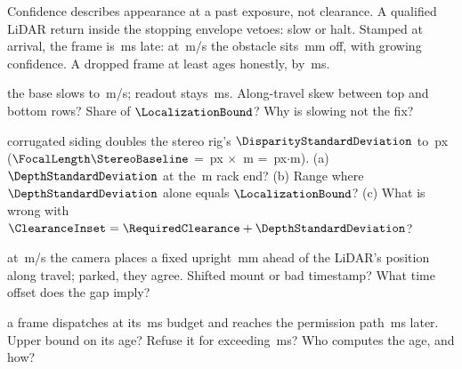 \documentclass{studysheet}
\begin{document}
\begin{rightcol}
%
  {Confidence describes appearance at a past exposure, not clearance. A qualified LiDAR return inside the
   stopping envelope vetoes: slow or halt.}{}
%
  {Stamped at arrival, the frame is \,ms late: at \,m/s the obstacle sits \,mm
   off, with growing confidence. A dropped frame at least ages honestly, by \,ms.}{}

\vspace{2pt}
\begin{qs}
\item \assumed{} the base slows to \,m/s; readout stays \,ms. Along-travel skew between top and
  bottom rows? Share of $\LocalizationBound$? Why is slowing not the fix?
\item \assumed{} corrugated siding doubles the stereo rig's $\DisparityStandardDeviation$ to \,px
  ($\FocalLength\StereoBaseline$ = \,px $\times$ \,m = \,px$\cdot$m). (a) $\DepthStandardDeviation$ at the
  \,m rack end? (b) Range where $\DepthStandardDeviation$ alone equals $\LocalizationBound$? (c) What is wrong with
  $\ClearanceInset = \RequiredClearance + \DepthStandardDeviation$?
\item \assumed{} at \,m/s the camera places a fixed upright \,mm ahead of the LiDAR's position
  along travel; parked, they agree. Shifted mount or bad timestamp? What time offset does the gap imply?
\item \assumed{} a frame dispatches at its \,ms budget and reaches the permission path \,ms later.
  Upper bound on its age? Refuse it for exceeding \,ms? Who computes the age, and how?
\end{qs}
\end{rightcol}
\end{document}
